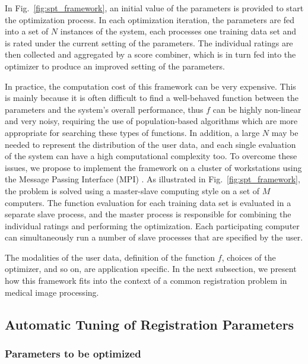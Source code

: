 \documentclass[]{spie}  %
\begin{document}
In Fig.~\ref{fig:spt_framework}, an initial value of the parameters is provided to start the optimization process. In each optimization iteration, the parameters are fed into a set of $N$ instances of the system, each processes one training data set and is rated under the current setting of the parameters. The individual ratings are then collected and aggregated by a score combiner, which is in turn fed into the optimizer to produce an improved setting of the parameters.

In practice, the computation cost of this framework can be very expensive. This is mainly because it is often difficult to find a well-behaved function between the parameters and the system's overall performance, thus $f$ can be highly non-linear and very noisy, requiring the use of population-based algorithms which are more appropriate for searching these types of functions. In addition, a large $N$ may be needed to represent the distribution of the user data, and each single evaluation of the system can have a high computational complexity too. To overcome these issues, we propose to implement the framework on a cluster of workstations using the Message Passing Interface (MPI) \cite{SkjellumAn1994b}. As illustrated in Fig.~\ref{fig:spt_framework}, the problem is solved using a master-slave computing style on a set of $M$ computers. The function evaluation for each training data set is evaluated in a separate slave process, and the master process is responsible for combining the individual ratings and performing the optimization. Each participating computer can simultaneously run a number of slave processes that are specified by the user.

The modalities of the user data, definition of the function $f$, choices of the optimizer, and so on, are application specific. In the next subsection, we present how this framework fits into the context of a common registration problem in medical image processing.

\subsection{Automatic Tuning of Registration Parameters}

\subsubsection{Parameters to be optimized}
\end{document}
